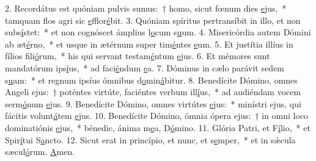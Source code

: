 2. Recordátus est quóniam pulvis sumus:~† homo, sicut fœnum dies \uline{e}jus,~* tamquam flos agri sic \uline{e}fflor\uline{é}bit.
3. Quóniam spíritus pertransíbit in illo, et non subs\uline{í}stet:~* et non cognóscet ámplius l\uline{o}cum s\uline{u}um.
4. Misericórdia autem Dómini ab æt\uline{é}rno,~* et usque in ætérnum super tim\uline{é}ntes \uline{e}um.
5. Et justítia illíus in fílios fili\uline{ó}rum,~* his qui servant testam\uline{é}ntum \uline{e}jus.
6. Et mémores sunt mandatórum ips\uline{í}us,~* ad faci\uline{é}ndum \uline{e}a.
7. Dóminus in cælo parávit sedem s\uline{u}am:~* et regnum ipsíus ómnibus d\uline{o}min\uline{á}bitur.
8. Benedícite Dómino, omnes Angeli ejus:~† poténtes virtúte, faciéntes verbum ill\uline{í}us,~* ad audiéndam vocem serm\uline{ó}num \uline{e}jus.
9. Benedícite Dómino, omnes virtútes \uline{e}jus:~* minístri ejus, qui fácitis volunt\uline{á}tem \uline{e}jus.
10. Benedícite Dómino, ómnia ópera ejus:~† in omni loco dominatiónis \uline{e}jus,~* bénedic, ánima m\uline{e}a, D\uline{ó}mino.
11. Glória Patri, et F\uline{í}lio,~* et Spir\uline{í}tui S\uline{a}ncto.
12. Sicut erat in princípio, et nunc, et s\uline{e}mper,~* et in sǽcula sæcul\uline{ó}rum. \uline{A}men.
